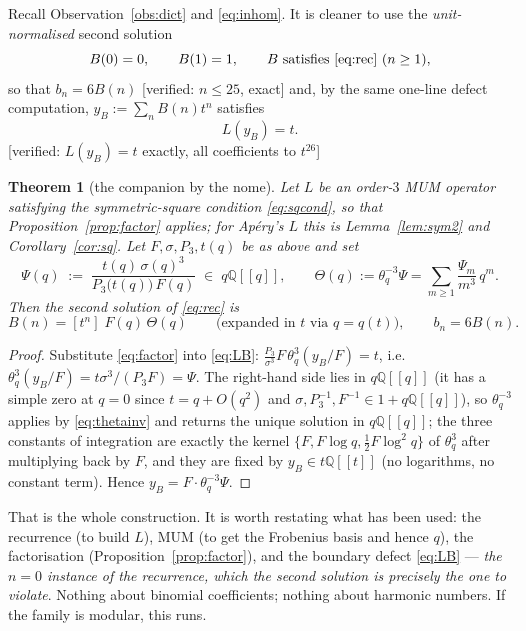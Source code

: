 \documentclass[11pt,reqno]{amsart}
\theoremstyle{plain}
\newtheorem{theorem}{Theorem}[section]
\theoremstyle{definition}
\theoremstyle{remark}
\newcommand{\Q}{\mathbb{Q}}
\newcommand{\Ver}[1]{\textup{\textsf{[verified: #1]}}}
\newcommand{\tq}{\theta_q}
\numberwithin{equation}{section}
\begin{document}
Recall Observation~\ref{obs:dict} and \eqref{eq:inhom}. It is cleaner to use
the \emph{unit-normalised} second solution
\[
  B(0)=0,\qquad B(1)=1,\qquad B\text{ satisfies }\eqref{eq:rec}\ (n\ge1),
\]
so that $b_n=6B(n)$ \Ver{$n\le25$, exact} and, by the same one-line defect
computation, $y_B:=\sum_nB(n)t^n$ satisfies
\begin{equation}\label{eq:LB}
  L(y_B)=t .
\end{equation}
\Ver{$L(y_B)=t$ exactly, all coefficients to $t^{26}$}

\begin{theorem}[the companion by the nome]\label{thm:companion}
Let $L$ be an order-$3$ MUM operator satisfying the symmetric-square condition
\eqref{eq:sqcond}, so that Proposition~\ref{prop:factor} applies; for Ap\'ery's
$L$ this is Lemma~\ref{lem:sym2} and Corollary~\ref{cor:sq}. Let
$F,\sigma,P_3,t(q)$ be as above and set
\begin{equation}\label{eq:Psi}
  \Psi(q)\;:=\;\frac{t(q)\,\sigma(q)^{3}}{P_3\bigl(t(q)\bigr)\,F(q)}
  \;\in\;q\Q[[q]],
  \qquad
  \Theta(q):=\tq^{-3}\Psi=\sum_{m\ge1}\frac{\Psi_m}{m^{3}}\,q^{m}.
\end{equation}
Then the second solution of \textup{\eqref{eq:rec}} is
\begin{equation}\label{eq:companion}
  B(n)=[t^{n}]\;F(q)\,\Theta(q)
  \qquad\bigl(\text{expanded in }t\text{ via }q=q(t)\bigr),
  \qquad b_n=6B(n).
\end{equation}
\end{theorem}

\begin{proof}
Substitute \eqref{eq:factor} into \eqref{eq:LB}:
$\frac{P_3}{\sigma^3}F\,\tq^3(y_B/F)=t$, i.e.\
$\tq^3(y_B/F)=t\sigma^3/(P_3F)=\Psi$. The right-hand side lies in $q\Q[[q]]$
(it has a simple zero at $q=0$ since $t=q+O(q^2)$ and
$\sigma,P_3^{-1},F^{-1}\in1+q\Q[[q]]$), so $\tq^{-3}$ applies by
\eqref{eq:thetainv} and returns the unique solution in $q\Q[[q]]$; the three
constants of integration are exactly the kernel $\{F,F\log q,\tfrac12F\log^2q\}$
of $\tq^3$ after multiplying back by $F$, and they are fixed by
$y_B\in t\Q[[t]]$ (no logarithms, no constant term). Hence $y_B=F\cdot\tq^{-3}\Psi$.
\end{proof}

That is the whole construction. It is worth restating what has been used: the
recurrence (to build $L$), MUM (to get the Frobenius basis and hence $q$), the
factorisation (Proposition~\ref{prop:factor}), and the boundary defect
\eqref{eq:LB} --- \emph{the $n=0$ instance of the recurrence, which the second
solution is precisely the one to violate}. Nothing about binomial coefficients;
nothing about harmonic numbers. If the family is modular, this runs.
\end{document}
